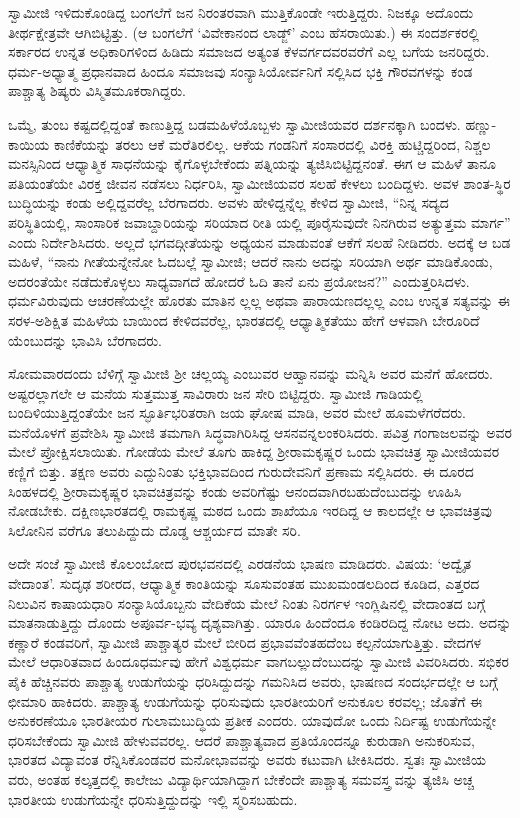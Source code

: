 ಸ್ವಾಮೀಜಿ ಇಳಿದುಕೊಂಡಿದ್ದ ಬಂಗಲೆಗೆ ಜನ ನಿರಂತರವಾಗಿ ಮುತ್ತಿಕೊಂಡೇ ಇರುತ್ತಿದ್ದರು. ನಿಜಕ್ಕೂ ಅದೊಂದು ತೀರ್ಥಕ್ಷೇತ್ರವೇ ಆಗಿಬಿಟ್ಟಿತ್ತು. (ಆ ಬಂಗಲೆಗೆ ‘ವಿವೇಕಾನಂದ ಲಾಡ್ಜ್​’ ಎಂಬ ಹೆಸರಾಯಿತು.) ಈ ಸಂದರ್ಶಕರಲ್ಲಿ ಸರ್ಕಾರದ ಉನ್ನತ ಅಧಿಕಾರಿಗಳಿಂದ ಹಿಡಿದು ಸಮಾಜದ ಅತ್ಯಂತ ಕೆಳವರ್ಗದವರವರೆಗೆ ಎಲ್ಲ ಬಗೆಯ ಜನರಿದ್ದರು. ಧರ್ಮ-ಅಧ್ಯಾತ್ಮ ಪ್ರಧಾನವಾದ ಹಿಂದೂ ಸಮಾಜವು ಸಂನ್ಯಾಸಿಯೋರ್ವನಿಗೆ ಸಲ್ಲಿಸಿದ ಭಕ್ತಿ ಗೌರವಗಳನ್ನು ಕಂಡ ಪಾಶ್ಚಾತ್ಯ ಶಿಷ್ಯರು ವಿಸ್ಮಿತಮೂಕರಾಗಿದ್ದರು.

ಒಮ್ಮೆ, ತುಂಬ ಕಷ್ಟದಲ್ಲಿದ್ದಂತೆ ಕಾಣುತ್ತಿದ್ದ ಬಡಮಹಿಳೆಯೊಬ್ಬಳು ಸ್ವಾಮೀಜಿಯವರ ದರ್ಶನಕ್ಕಾಗಿ ಬಂದಳು. ಹಣ್ಣು-ಕಾಯಿಯ ಕಾಣಿಕೆಯನ್ನು ತರಲು ಆಕೆ ಮರೆತಿರಲಿಲ್ಲ. ಆಕೆಯ ಗಂಡನಿಗೆ ಸಂಸಾರದಲ್ಲಿ ವಿರಕ್ತಿ ಹುಟ್ಚಿದ್ದರಿಂದ, ನಿಶ್ಚಲ ಮನಸ್ಸಿನಿಂದ ಆಧ್ಯಾತ್ಮಿಕ ಸಾಧನೆಯನ್ನು ಕೈಗೊಳ್ಳಬೇಕೆಂದು ಪತ್ನಿಯನ್ನು ತ್ಯಜಿಸಿಬಿಟ್ಟಿದ್ದನಂತೆ. ಈಗ ಆ ಮಹಿಳೆ ತಾನೂ ಪತಿಯಂತೆಯೇ ವಿರಕ್ತ ಜೀವನ ನಡೆಸಲು ನಿರ್ಧರಿಸಿ, ಸ್ವಾಮೀಜಿಯವರ ಸಲಹೆ ಕೇಳಲು ಬಂದಿದ್ದಳು. ಅವಳ ಶಾಂತ-ಸ್ಥಿರ ಬುದ್ಧಿಯನ್ನು ಕಂಡು ಅಲ್ಲಿದ್ದವರೆಲ್ಲ ಬೆರಗಾದರು. ಅವಳು ಹೇಳಿದ್ದನ್ನೆಲ್ಲ ಕೇಳಿದ ಸ್ವಾಮೀಜಿ, “ನಿನ್ನ ಸದ್ಯದ ಪರಿಸ್ಥಿತಿಯಲ್ಲಿ, ಸಾಂಸಾರಿಕ ಜವಾಬ್ದಾರಿಯನ್ನು ಸರಿಯಾದ ರೀತಿ ಯಲ್ಲಿ ಪೂರೈಸುವುದೇ ನಿನಗಿರುವ ಅತ್ಯುತ್ತಮ ಮಾರ್ಗ” ಎಂದು ನಿರ್ದೇಶಿಸಿದರು. ಅಲ್ಲದೆ ಭಗವದ್ಗೀತೆಯನ್ನು ಅಧ್ಯಯನ ಮಾಡುವಂತೆ ಆಕೆಗೆ ಸಲಹೆ ನೀಡಿದರು. ಅದಕ್ಕೆ ಆ ಬಡ ಮಹಿಳೆ, “ನಾನು ಗೀತೆಯನ್ನೇನೋ ಓದಬಲ್ಲೆ ಸ್ವಾಮೀಜಿ; ಆದರೆ ನಾನು ಅದನ್ನು ಸರಿಯಾಗಿ ಅರ್ಥ ಮಾಡಿಕೊಂಡು, ಅದರಂತೆಯೇ ನಡೆದುಕೊಳ್ಳಲು ಸಾಧ್ಯವಾಗದೆ ಹೋದರೆ ಓದಿ ತಾನೆ ಏನು ಪ್ರಯೋಜನ?” ಎಂದುತ್ತರಿಸಿದಳು. ಧರ್ಮವಿರುವುದು ಆಚರಣೆಯಲ್ಲೇ ಹೊರತು ಮಾತಿನ ಲ್ಲಲ್ಲ ಅಥವಾ ಪಾರಾಯಣದಲ್ಲಲ್ಲ ಎಂಬ ಉನ್ನತ ಸತ್ಯವನ್ನು ಈ ಸರಳ-ಅಶಿಕ್ಷಿತ ಮಹಿಳೆಯ ಬಾಯಿಂದ ಕೇಳಿದವರೆಲ್ಲ, ಭಾರತದಲ್ಲಿ ಆಧ್ಯಾತ್ಮಿಕತೆಯು ಹೇಗೆ ಆಳವಾಗಿ ಬೇರೂರಿದೆ ಯೆಂಬುದನ್ನು ಭಾವಿಸಿ ಬೆರಗಾದರು.

ಸೋಮವಾರದಂದು ಬೆಳಿಗ್ಗೆ ಸ್ವಾಮೀಜಿ ಶ್ರೀ ಚಲ್ಲಯ್ಯ ಎಂಬುವರ ಆಹ್ವಾನವನ್ನು ಮನ್ನಿಸಿ ಅವರ ಮನೆಗೆ ಹೋದರು. ಅಷ್ಟರಲ್ಲಾಗಲೇ ಆ ಮನೆಯ ಸುತ್ತಮುತ್ತ ಸಾವಿರಾರು ಜನ ಸೇರಿ ಬಿಟ್ಟಿದ್ದರು. ಸ್ವಾಮೀಜಿ ಗಾಡಿಯಲ್ಲಿ ಬಂದಿಳಿಯುತ್ತಿದ್ದಂತೆಯೇ ಜನ ಸ್ಫೂರ್ತಿಭರಿತರಾಗಿ ಜಯ ಘೋಷ ಮಾಡಿ, ಅವರ ಮೇಲೆ ಹೂಮಳೆಗರೆದರು. ಮನೆಯೊಳಗೆ ಪ್ರವೇಶಿಸಿ ಸ್ವಾಮೀಜಿ ತಮಗಾಗಿ ಸಿದ್ಧವಾಗಿರಿಸಿದ್ದ ಆಸನವನ್ನಲಂಕರಿಸಿದರು. ಪವಿತ್ರ ಗಂಗಾಜಲವನ್ನು ಅವರ ಮೇಲೆ ಪ್ರೋಕ್ಷಿಸಲಾಯಿತು. ಗೋಡೆಯ ಮೇಲೆ ತೂಗು ಹಾಕಿದ್ದ ಶ್ರೀರಾಮಕೃಷ್ಣರ ಒಂದು ಭಾವಚಿತ್ರ ಸ್ವಾಮೀಜಿಯವರ ಕಣ್ಣಿಗೆ ಬಿತ್ತು. ತಕ್ಷಣ ಅವರು ಎದ್ದುನಿಂತು ಭಕ್ತಿಭಾವದಿಂದ ಗುರುದೇವನಿಗೆ ಪ್ರಣಾಮ ಸಲ್ಲಿಸಿದರು. ಈ ದೂರದ ಸಿಂಹಳದಲ್ಲಿ ಶ್ರೀರಾಮಕೃಷ್ಣರ ಭಾವಚಿತ್ರವನ್ನು ಕಂಡು ಅವರಿಗೆಷ್ಟು ಆನಂದವಾಗಿರಬಹುದೆಂಬುದನ್ನು ಊಹಿಸಿ ನೋಡಬೇಕು. ದಕ್ಷಿಣಭಾರತದಲ್ಲಿ ರಾಮಕೃಷ್ಣ ಮಠದ ಒಂದು ಶಾಖೆಯೂ ಇರದಿದ್ದ ಆ ಕಾಲದಲ್ಲೇ ಆ ಭಾವಚಿತ್ರವು ಸಿಲೋನಿನ ವರೆಗೂ ತಲುಪಿದ್ದುದು ದೊಡ್ಡ ಆಶ್ಚರ್ಯದ ಮಾತೇ ಸರಿ.

ಅದೇ ಸಂಜೆ ಸ್ವಾಮೀಜಿ ಕೊಲಂಬೋದ ಪುರಭವನದಲ್ಲಿ ಎರಡನೆಯ ಭಾಷಣ ಮಾಡಿದರು. ವಿಷಯ: ‘ಅದ್ವೈತ ವೇದಾಂತ’. ಸುದೃಢ ಶರೀರದ, ಆಧ್ಯಾತ್ಮಿಕ ಕಾಂತಿಯನ್ನು ಸೂಸುವಂತಹ ಮುಖಮಂಡಲದಿಂದ ಕೂಡಿದ, ಎತ್ತರದ ನಿಲುವಿನ ಕಾಷಾಯಧಾರಿ ಸಂನ್ಯಾಸಿಯೊಬ್ಬನು ವೇದಿಕೆಯ ಮೇಲೆ ನಿಂತು ನಿರರ್ಗಳ ಇಂಗ್ಲಿಷಿನಲ್ಲಿ ವೇದಾಂತದ ಬಗ್ಗೆ ಮಾತನಾಡುತ್ತಿದ್ದು ದೊಂದು ಅಪೂರ್ವ-ಭವ್ಯ ದೃಶ್ಯವಾಗಿತ್ತು. ಯಾರೂ ಹಿಂದೆಂದೂ ಕಂಡಿರದಿದ್ದ ನೋಟ ಅದು. ಅದನ್ನು ಕಣ್ಣಾರೆ ಕಂಡವರಿಗೆ, ಸ್ವಾಮೀಜಿ ಪಾಶ್ಚಾತ್ಯರ ಮೇಲೆ ಬೀರಿದ ಪ್ರಭಾವವೆಂತಹದೆಂಬ ಕಲ್ಪನೆಯಾಗುತ್ತಿತ್ತು. ವೇದಗಳ ಮೇಲೆ ಆಧಾರಿತವಾದ ಹಿಂದೂಧರ್ಮವು ಹೇಗೆ ವಿಶ್ವಧರ್ಮ ವಾಗಬಲ್ಲುದೆಂಬುದನ್ನು ಸ್ವಾಮೀಜಿ ವಿವರಿಸಿದರು. ಸಭಿಕರ ಪೈಕಿ ಹೆಚ್ಚಿನವರು ಪಾಶ್ಚಾತ್ಯ ಉಡುಗೆಯನ್ನು ಧರಿಸಿದ್ದುದನ್ನು ಗಮನಿಸಿದ ಅವರು, ಭಾಷಣದ ಸಂದರ್ಭದಲ್ಲೇ ಆ ಬಗ್ಗೆ ಛೀಮಾರಿ ಹಾಕಿದರು. ಪಾಶ್ಚಾತ್ಯ ಉಡುಗೆಯನ್ನು ಧರಿಸುವುದು ಭಾರತೀಯರಿಗೆ ಅನುಕೂಲ ಕರವಲ್ಲ; ಜೊತೆಗೆ ಈ ಅನುಕರಣೆಯೂ ಭಾರತೀಯರ ಗುಲಾಮಬುದ್ಧಿಯ ಪ್ರತೀಕ ಎಂದರು. ಯಾವುದೋ ಒಂದು ನಿರ್ದಿಷ್ಟ ಉಡುಗೆಯನ್ನೇ ಧರಿಸಬೇಕೆಂದು ಸ್ವಾಮೀಜಿ ಹೇಳುವವರಲ್ಲ. ಆದರೆ ಪಾಶ್ಚಾತ್ಯವಾದ ಪ್ರತಿಯೊಂದನ್ನೂ ಕುರುಡಾಗಿ ಅನುಕರಿಸುವ, ಭಾರತದ ವಿದ್ಯಾವಂತ ರೆನ್ನಿಸಿಕೊಂಡವರ ಮನೋಭಾವವನ್ನು ಅವರು ಕಟುವಾಗಿ ಟೀಕಿಸಿದರು. ಸ್ವತಃ ಸ್ವಾಮೀಜಿಯ ವರು, ಅಂತಹ ಕಲ್ಕತ್ತದಲ್ಲಿ ಕಾಲೇಜು ವಿದ್ಯಾರ್ಥಿಯಾಗಿದ್ದಾಗ ಬೇಕೆಂದೇ ಪಾಶ್ಚಾತ್ಯ ಸಮವಸ್ತ್ರ ವನ್ನು ತ್ಯಜಿಸಿ ಅಚ್ಚ ಭಾರತೀಯ ಉಡುಗೆಯನ್ನೇ ಧರಿಸುತ್ತಿದ್ದುದನ್ನು ಇಲ್ಲಿ ಸ್ಮರಿಸಬಹುದು.

